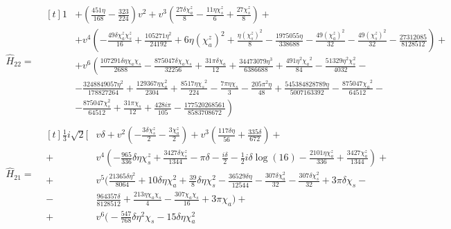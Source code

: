 \documentclass[twocolumn,prd,aps,superscriptaddress,preprintnumbers,tightenlines,showpacs,nofootinbib,eqsecnum,amsfonts,amsmath]{revtex4}
\begin{document}
\begin{widetext}
\begin{align}
\hat{H}_{22} =& 
\begin{aligned}[t]
1 &+ \left(\frac{451 \eta }{168}-\frac{323}{224}\right) v^2  +v^3 \left(\frac{27 \delta  \chi_a^z}{8}-\frac{11 \eta  \chi_s^z}{6}+\frac{27 \chi_s^z}{8}\right) +
   \\ 
   &+ v^4 \left(-\frac{49 \delta  \chi_a^z \chi_s^z}{16}+\frac{105271 \eta^2}{24192}+6 \eta  (\chi_a^z)^2+\frac{\eta  \left(\chi_s^z\right)^2}{8}
   -\frac{1975055 \eta }{338688}-\frac{49 (\chi_a^z)^2}{32}-\frac{49 \left(\chi_s^z\right)^2}{32}-\frac{27312085}{8128512}\right) +
  \\
  &+ v^6 \left(\frac{107291 \delta  \eta  \chi_a \chi_s}{2688}-\frac{875047 \delta 
 \chi_a \chi_s}{32256}+\frac{31 \pi  \delta  \chi_a}{12}+\frac{34473079 \eta ^3}{6386688}+\frac{491 \eta^2 {\chi_a}^2}{84}-\frac{51329 \eta^2 \chi_s^2}{4032}- \right.
  \\
  &  -\frac{3248849057 \eta^2}{178827264}+\frac{129367 \eta  \chi_a^2}{2304}+\frac{8517 \eta  {\chi_s}^2}{224}-\frac{7 \pi  \eta  \chi_s}{3}-\frac{205 \pi^2 \eta
  }{48}+\frac{545384828789 \eta }{5007163392}-\frac{875047 {\chi_a}^2}{64512} -
  \\
  & \left. -\frac{875047 \chi_s^2}{64512}+\frac{31 \pi  {\chi_s}}{12}+\frac{428 i \pi }{105}-\frac{177520268561}{8583708672} \right)  
\end{aligned}
\\
\hat{H}_{21} =& 
\begin{aligned}[t]
\label{eq:21amp}
\frac{1}{3} i \sqrt{2} \Bigg[& v \delta + v^2
  \left(-\frac{3 \delta  \chi_s^z}{2}-\frac{3 \chi_a^z}{2}\right)
 +v^3 \left(\frac{117 \delta  \eta }{56}+\frac{335 \delta }{672}\right) +
 \\+&v^4 \left( -\frac{965}{336} \delta  \eta  \chi_s^z+\frac{3427 \delta  \chi_s^z}{1344}-\pi  \delta -\frac{i \delta }{2}-\frac{1}{2}   i \delta  \log (16)-\frac{2101 \eta  \chi_a^z}{336}+\frac{3427 \chi_a^z}{1344}\right)+
 \\
 +& v^5 \Bigg(\frac{21365 \delta  \eta^2}{8064}+10 \delta  \eta  \chi_a^2+\frac{39}{8}
   \delta  \eta  \chi_s^2-\frac{36529 \delta  \eta }{12544}-\frac{307 \delta 
   \chi_a^2}{32}-\frac{307 \delta  \chi_s^2}{32}+3 \pi  \delta  \chi_s -
   \\-&\frac{964357 \delta }{8128512}+\frac{213 \eta  \chi_a {\chi_s}}{4}-\frac{307 \chi_a \chi_s}{16}+3 \pi  \chi_a\Bigg) +
\\+&  v^6 \Bigg(-\frac{547}{768} \delta  \eta^2 \chi_s-15 \delta  \eta  \chi_a^2

\end{aligned}
\end{align}
\end{widetext}
\end{document}
